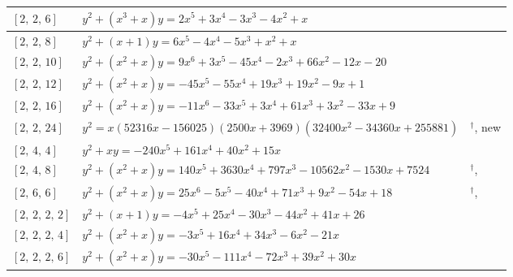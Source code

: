 \documentclass[11pt]{amsart}
\begin{document}
\begin{longtable}{|>{\raggedright\arraybackslash}p{1.7cm}|>{\raggedright\arraybackslash}p{}|>{\raggedright\arraybackslash}p{2.6cm}|}
$[2,\,2,\,6]$ & \href{https://www.lmfdb.org/Genus2Curve/Q/600/a/18000/1}{$y^2 + (x^{3}+x)y = 2x^{5}+3x^{4}-3x^{3}-4x^{2}+x$} & \cite{BSSVY}\\ \hline
$[2,\,2,\,8]$ & \href{https://www.lmfdb.org/Genus2Curve/Q/360/a/6480/1}{$y^2 + (x+1)y = 6x^{5}-4x^{4}-5x^{3}+x^{2}+x$} & \cite{BSSVY}\\ \hline
$[2,\,2,\,10]$ & \href{https://alpha.lmfdb.org/Genus2Curve/Q/?jump=[[-20,-12,66,-2,-45,3,9],[0,1,1]]}{$y^2 + (x^{2}+x)y = 9x^{6}+3x^{5}-45x^{4}-2x^{3}+66x^{2}-12x-20$} & \cite{BookerSutherland}\\ \hline
$[2,\,2,\,12]$ & \href{https://alpha.lmfdb.org/Genus2Curve/Q/?jump=[[1,-9,19,19,-55,-45],[0,1,1]]}{$y^2 + (x^{2}+x)y = -45x^{5}-55x^{4}+19x^{3}+19x^{2}-9x+1$} & \cite{BookerSutherland}\\ \hline
$[2,\,2,\,16]$ & \href{https://alpha.lmfdb.org/Genus2Curve/Q/?jump=[[9,-33,3,61,3,-33,-11],[0,1,1]]}{$y^2 + (x^{2}+x)y = -11x^{6}-33x^{5}+3x^{4}+61x^{3}+3x^{2}-33x+9$} & \cite{BookerSutherland}\\ \hline
$[2,\,2,\,24]$ & $y^2 = x(52316x-156025)(2500x+3969)(32400x^{2}-34360x+255881)$ & \cite{HLP2000}$^\dagger$, new\\ \hline
$[2,\,4,\,4]$ & \href{https://alpha.lmfdb.org/Genus2Curve/Q/?jump=[[0,15,40,0,161,-240],[0,1]]}{$y^2 + xy = -240x^{5}+161x^{4}+40x^{2}+15x$} & \cite{BookerSutherland}\\ \hline
$[2,\,4,\,8]$ & \href{https://alpha.lmfdb.org/Genus2Curve/Q/?jump=[[7524,-1530,-10562,797,3630,140],[0,1,1]]}{$y^2 + (x^{2}+x)y = 140x^{5}+3630x^{4}+797x^{3}-10562x^{2}-1530x+7524$} & \cite{HLP2000}$^\dagger$, \cite{BookerSutherland}\\ \hline
$[2,\,6,\,6]$ & \href{https://alpha.lmfdb.org/Genus2Curve/Q/?jump=[[18,-54,9,71,-40,-5,25],[0,1,1]]}{$y^2 + (x^{2}+x)y = 25x^{6}-5x^{5}-40x^{4}+71x^{3}+9x^{2}-54x+18$} & \cite{HLP2000}$^\dagger$, \cite{BookerSutherland}\\ \hline
$[2,\,2,\,2,\,2]$ & \href{https://alpha.lmfdb.org/Genus2Curve/Q/?jump=[[26,41,-44,-30,25,-4],[1,1]]}{$y^2 + (x+1)y = -4x^{5}+25x^{4}-30x^{3}-44x^{2}+41x+26$} & \cite{BookerSutherland}\\ \hline
$[2,\,2,\,2,\,4]$ & \href{https://alpha.lmfdb.org/Genus2Curve/Q/?jump=[[0,-21,-6,34,16,-3],[0,1,1]]}{$y^2 + (x^{2}+x)y = -3x^{5}+16x^{4}+34x^{3}-6x^{2}-21x$} & \cite{BookerSutherland}\\ \hline
$[2,\,2,\,2,\,6]$ & \href{https://alpha.lmfdb.org/Genus2Curve/Q/?jump=[[0,30,39,-72,-111,-30],[0,1,1]]}{$y^2 + (x^{2}+x)y = -30x^{5}-111x^{4}-72x^{3}+39x^{2}+30x$} & \cite{BookerSutherland}\\ \hline

\end{longtable}
\end{document}

